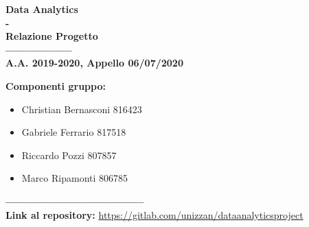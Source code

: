 \begin{center}
    {\Huge \textbf{Data Analytics}}\\
    {\Huge \textbf{-}}\\
    {\Huge \textbf{Relazione Progetto}}\\
    {\Huge \textbf{------------------}}\\
    {\textbf{A.A. 2019-2020, Appello 06/07/2020}}\\
\end{center}

\vspace{4cm}

\large\textbf{Componenti gruppo:}\\
\begin{itemize}
    \item Christian Bernasconi 816423\\
    \item Gabriele Ferrario 817518\\
    \item Riccardo Pozzi 807857\\
    \item Marco Ripamonti 806785    
\end{itemize}

{\Huge \textbf{--------------------------------------}}\\
\small\textbf{Link al repository:} \url{https://gitlab.com/unizzan/dataanalyticsproject}